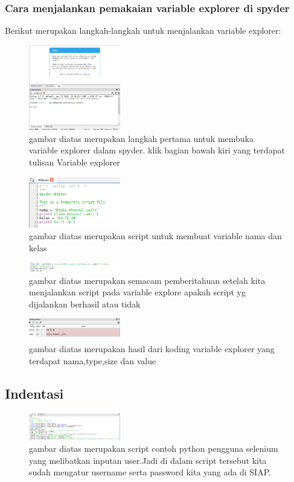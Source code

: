 \subsubsection{Cara menjalankan pemakaian variable explorer di spyder}
 Berikut merupakan langkah-langkah untuk menjalankan variable explorer:
\begin{figure}[H]
		\includegraphics[width=4cm]{figures/1184065/Variable_explorer.PNG}
		\centering
		\caption{gambar diatas merupakan langkah pertama untuk membuka variable explorer dalam spyder. klik bagian bawah kiri yang terdapat tulisan Variable explorer }
	\end{figure}
	\begin{figure}[H]
		\includegraphics[width=4cm]{figures/1184065/KodingVariable.PNG}
		\centering
		\caption{gambar diatas merupakan script untuk membuat variable nama dan kelas}
	\end{figure}
	\begin{figure}[H]
		\includegraphics[width=4cm]{figures/1184065/RunFileVariable.PNG}
		\centering
		\caption{gambar diatas merupakan semacam pemberitahuan setelah kita menjalankan script pada variable explore apakah script yg dijalankan berhasil atau tidak }
	\end{figure}
	\begin{figure}[H]
		\includegraphics[width=4cm]{figures/1184065/ValueVariable.PNG}
		\centering
		\caption{gambar diatas merupakan hasil dari koding variable explorer yang terdapat nama,type,size dan value }
	\end{figure}
\subsection{Indentasi}
\begin{figure}[H]
		\includegraphics[width=4cm]{figures/1184065/KodingPenggunaOtomatis.PNG}
		\centering
		\caption{gambar diatas merupakan script contoh python pengguna selenium yang melibatkan inputan user.Jadi di dalam script tersebut kita sudah mengatur username serta password kita yang ada di SIAP.}
	\end{figure}
